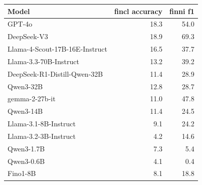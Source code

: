\begin{tabular}{lrr}
\toprule
Model & fincl accuracy & finni f1 \\
\midrule
GPT-4o & 18.3 & 54.0 \\
DeepSeek-V3 & 18.9 & 69.3 \\
Llama-4-Scout-17B-16E-Instruct & 16.5 & 37.7 \\
Llama-3.3-70B-Instruct & 13.2 & 39.2 \\
DeepSeek-R1-Distill-Qwen-32B & 11.4 & 28.9 \\
Qwen3-32B & 12.8 & 28.7 \\
gemma-2-27b-it & 11.0 & 47.8 \\
Qwen3-14B & 11.4 & 24.5 \\
Llama-3.1-8B-Instruct & 9.1 & 24.2 \\
Llama-3.2-3B-Instruct & 4.2 & 14.6 \\
Qwen3-1.7B & 7.3 & 5.4 \\
Qwen3-0.6B & 4.1 & 0.4 \\
Fino1-8B & 8.1 & 18.8 \\
\bottomrule
\end{tabular}
